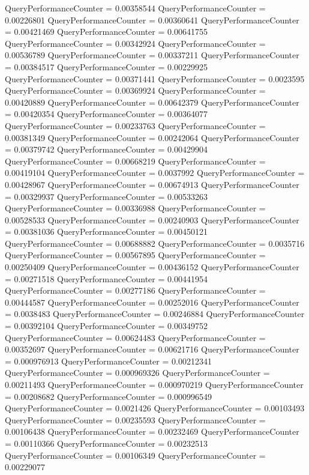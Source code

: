 \documentclass[9pt]{article}
\theoremstyle{plain}
\theoremstyle{definition}
\theoremstyle{remark}
\numberwithin{equation}{section}
\begin{document}
QueryPerformanceCounter  =  0.00358544
QueryPerformanceCounter  =  0.00226801
QueryPerformanceCounter  =  0.00360641
QueryPerformanceCounter  =  0.00421469
QueryPerformanceCounter  =  0.00641755
QueryPerformanceCounter  =  0.00342924
QueryPerformanceCounter  =  0.00536789
QueryPerformanceCounter  =  0.00337211
QueryPerformanceCounter  =  0.00384517
QueryPerformanceCounter  =  0.00229925
QueryPerformanceCounter  =  0.00371441
QueryPerformanceCounter  =  0.0023595
QueryPerformanceCounter  =  0.00369924
QueryPerformanceCounter  =  0.00420889
QueryPerformanceCounter  =  0.00642379
QueryPerformanceCounter  =  0.00420354
QueryPerformanceCounter  =  0.00364077
QueryPerformanceCounter  =  0.00233763
QueryPerformanceCounter  =  0.00381349
QueryPerformanceCounter  =  0.00242064
QueryPerformanceCounter  =  0.00379742
QueryPerformanceCounter  =  0.00429904
QueryPerformanceCounter  =  0.00668219
QueryPerformanceCounter  =  0.00419104
QueryPerformanceCounter  =  0.0037992
QueryPerformanceCounter  =  0.00428967
QueryPerformanceCounter  =  0.00674913
QueryPerformanceCounter  =  0.00329937
QueryPerformanceCounter  =  0.00533263
QueryPerformanceCounter  =  0.00336988
QueryPerformanceCounter  =  0.00528533
QueryPerformanceCounter  =  0.00240903
QueryPerformanceCounter  =  0.00381036
QueryPerformanceCounter  =  0.00450121
QueryPerformanceCounter  =  0.00688882
QueryPerformanceCounter  =  0.0035716
QueryPerformanceCounter  =  0.00567895
QueryPerformanceCounter  =  0.00250409
QueryPerformanceCounter  =  0.00436152
QueryPerformanceCounter  =  0.00271518
QueryPerformanceCounter  =  0.00441954
QueryPerformanceCounter  =  0.00277186
QueryPerformanceCounter  =  0.00444587
QueryPerformanceCounter  =  0.00252016
QueryPerformanceCounter  =  0.0038483
QueryPerformanceCounter  =  0.00246884
QueryPerformanceCounter  =  0.00392104
QueryPerformanceCounter  =  0.00349752
QueryPerformanceCounter  =  0.00624483
QueryPerformanceCounter  =  0.00352697
QueryPerformanceCounter  =  0.00621716
QueryPerformanceCounter  =  0.000976913
QueryPerformanceCounter  =  0.00212341
QueryPerformanceCounter  =  0.000969326
QueryPerformanceCounter  =  0.00211493
QueryPerformanceCounter  =  0.000970219
QueryPerformanceCounter  =  0.00208682
QueryPerformanceCounter  =  0.000996549
QueryPerformanceCounter  =  0.0021426
QueryPerformanceCounter  =  0.00103493
QueryPerformanceCounter  =  0.00235593
QueryPerformanceCounter  =  0.00106438
QueryPerformanceCounter  =  0.00232469
QueryPerformanceCounter  =  0.00110366
QueryPerformanceCounter  =  0.00232513
QueryPerformanceCounter  =  0.00106349
QueryPerformanceCounter  =  0.00229077
\end{document}
